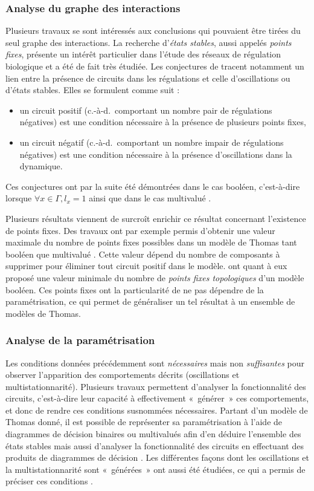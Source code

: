 \subsubsection*{Analyse du graphe des interactions}
Plusieurs travaux se sont intéressés aux conclusions qui pouvaient être
tirées du seul graphe des interactions.
La recherche d'\emph{états stables}, aussi appelés \emph{points fixes},
présente un intérêt particulier dans l'étude des réseaux de régulation biologique
et a été de fait très étudiée.
Les conjectures de 
tracent notamment un lien entre la présence de circuits dans les régulations et celle
d'oscillations ou d'états stables.
Elles se formulent comme suit :
\begin{itemize}
  \item un circuit positif (c.-à-d.~comportant un nombre pair de régulations négatives)
    est une condition nécessaire à la présence de plusieurs points fixes,
  \item un circuit négatif (c.-à-d.~comportant un nombre impair de régulations négatives)
    est une condition nécessaire à la présence d'oscillations dans la dynamique.
\end{itemize}
Ces conjectures ont par la suite été démontrées
dans le cas booléen, c'est-à-dire lorsque $\forall x \in \Gamma, l_x = 1$
\cite{RRT08,Richard06thesis}
ainsi que dans le cas multivalué \cite{RiCo07,Richard10}.

Plusieurs résultats viennent de surcroît enrichir ce résultat concernant
l'existence de points fixes.
Des travaux ont par exemple
permis d'obtenir une valeur maximale du nombre de points fixes possibles
dans un modèle de Thomas tant booléen \cite{aracena2008maximum} que multivalué \cite{Richard09}.
Cette valeur dépend du nombre de composants à supprimer pour éliminer
tout circuit positif dans le modèle.
 ont quant à eux proposé une valeur minimale du nombre de
\emph{points fixes topologiques} d'un modèle booléen.
Ces points fixes ont la particularité de ne pas dépendre de la paramétrisation,
ce qui permet de généraliser un tel résultat à un ensemble de modèles de Thomas.

\subsubsection*{Analyse de la paramétrisation}
Les conditions données précédemment sont \emph{nécessaires} mais non \emph{suffisantes}
pour observer l'apparition des comportements décrits (oscillations et multistationnarité).
Plusieurs travaux permettent d'analyser la fonctionnalité des circuits,
c'est-à-dire leur capacité à effectivement «~générer~» ces comportements,
et donc de rendre ces conditions susnommées nécessaires.
Partant d'un modèle de Thomas donné,
il est possible de représenter sa paramétrisation
à l'aide de diagrammes de décision binaires ou multivalués \cite{Bryant86,Srinivasan90}
afin d'en déduire
l'ensemble des états stables mais aussi d'analyser la fonctionnalité des circuits
en effectuant des produits de diagrammes de décision \cite{Naldi07}.
Les différentes façons dont les oscillations et la multistationnarité sont «~générées~»
ont aussi été étudiées, ce qui a permis de préciser ces conditions \cite{Comet13}.

